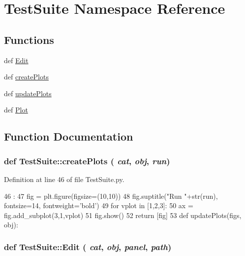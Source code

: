 \hypertarget{namespaceTestSuite}{
\section{TestSuite Namespace Reference}
\label{namespaceTestSuite}
}
\subsection*{Functions}
\begin{DoxyCompactItemize}
\item 
def \hyperlink{namespaceTestSuite_a5f55a06fcf9c87dc015edfa4795bdfee}{Edit}
\item 
def \hyperlink{namespaceTestSuite_a2f2c20d1bbc4f31936c3d6c1b34d793c}{createPlots}
\item 
def \hyperlink{namespaceTestSuite_a96c7c1a8754556cdab5561c25f693f3c}{updatePlots}
\item 
def \hyperlink{namespaceTestSuite_a2e449c6ed170543941b00b002ea87bf6}{Plot}
\end{DoxyCompactItemize}


\subsection{Function Documentation}
\hypertarget{namespaceTestSuite_a2f2c20d1bbc4f31936c3d6c1b34d793c}{
\subsubsection[{createPlots}]{\setlength{\rightskip}{0pt plus 5cm}def TestSuite::createPlots ( {\em cat}, \/   {\em obj}, \/   {\em run})}}
\label{namespaceTestSuite_a2f2c20d1bbc4f31936c3d6c1b34d793c}


Definition at line 46 of file TestSuite.py.


\begin{DoxyCode}
46                               :
47     fig = plt.figure(figsize=(10,10))
48     fig.suptitle("Run "+str(run), fontsize=14, fontweight='bold')
49     for vplot in [1,2,3]:
50         ax = fig.add_subplot(3,1,vplot)
51     fig.show()    
52     return [fig]
53 
def updatePlots(figs, obj):
\end{DoxyCode}
\hypertarget{namespaceTestSuite_a5f55a06fcf9c87dc015edfa4795bdfee}{
\subsubsection[{Edit}]{\setlength{\rightskip}{0pt plus 5cm}def TestSuite::Edit ( {\em cat}, \/   {\em obj}, \/   {\em panel}, \/   {\em path})}}
\label{namespaceTestSuite_a5f55a06fcf9c87dc015edfa4795bdfee}


